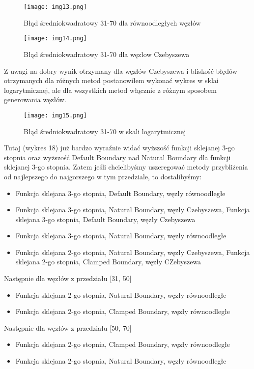 \documentclass{article}
\begin{document}
\begin{figure}[H]
  \begin{minipage}[b]{0.49\textwidth}
    \texttt{[image: img13.png]}
    \caption{Błąd średniokwadratowy 31-70 dla równoodległych węzłów}
  \end{minipage}
  \hfill
  \begin{minipage}[b]{0.49\textwidth}
    \texttt{[image: img14.png]}
    \caption{Błąd średniokwadratowy 31-70 dla węzłow Czebyszewa}
  \end{minipage}
\end{figure}

\noindent
Z uwagi na dobry wynik otrzymany dla węzłów Czebyszewa i bliskość błędów otrzymanych dla różnych metod postanowiłem wykonać wykres w sklai logarytmicznej, ale dla wszystkich metod włącznie z różnym sposobem generowania węzłów.


\begin{figure}[H]
  \centering
  \begin{minipage}[b]{0.93\textwidth}
    \texttt{[image: img15.png]}
    \caption{Błąd średniokwadratowy 31-70 w skali logarytmicznej}
  \end{minipage}
\end{figure}

\noindent
Tutaj (wykres 18) już bardzo wyraźnie widać wyższość funkcji sklejanej 3-go stopnia oraz wyższość Default Boundary nad Natural Boundary dla funkcji sklejanej 3-go stopnia. Zatem jeśli chcielibyśmy uszeregować metody przybliżenia od najlepszego do najgorszego w tym przedziale, to dostalibyśmy:

\begin{itemize}
\item Funkcja sklejana 3-go stopnia, Default Boundary, węzły równoodległe
\item Funkcja sklejana 3-go stopnia, Natural Boundary, węzły Czebyszewa, Funkcja sklejana 3-go stopnia, Default Boundary, węzły Czebyszewa
\item Funkcja sklejana 3-go stopnia, Natural Boundary, węzły równoodległe
\item Funkcja sklejana 2-go stopnia, Natural Boundary, węzły Czebyszewa, Funkcja sklejana 2-go stopnia, Clamped Boundary, węzły CZebyszewa
\end{itemize}
Następnie dla węzłów z przedziału [31, 50]
\begin{itemize}
\item Funkcja sklejana 2-go stopnia, Natural Boundary, węzły równoodległe
\item Funkcja sklejana 2-go stopnia, Clamped Boundary, węzły równoodległe
\end{itemize}
Następnie dla węzłów z przedziału [50, 70]
\begin{itemize}
\item Funkcja sklejana 2-go stopnia, Clamped Boundary, węzły równoodległe
\item Funkcja sklejana 2-go stopnia, Natural Boundary, węzły równoodległe
\end{itemize}
\end{document}
